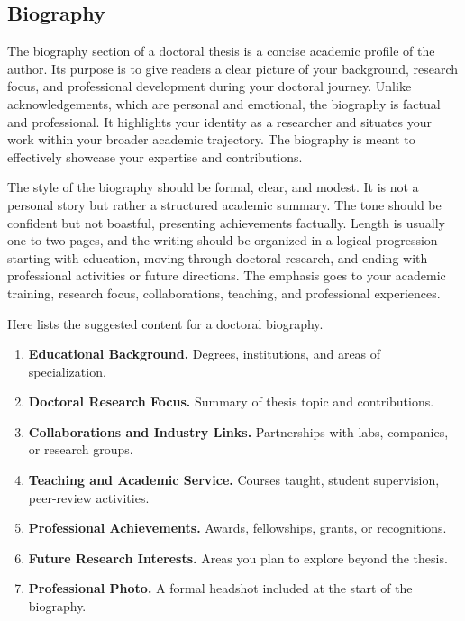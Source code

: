 \documentclass[PCOM,Thesis,Review]{mpThesis}
\newcommand{\Hd}[1]{{\color{SteelBlue}\bf#1.}}
\begin{document}
\begin{Appendix}
\chapter{Biography}
\label{app:biography}

\begin{Remark}
The biography section of a doctoral thesis is a concise academic profile of the author.
Its purpose is to give readers a clear picture of your background, research focus, and professional development during your doctoral journey.
Unlike acknowledgements, which are personal and emotional, the biography is factual and professional.
It highlights your identity as a researcher and situates your work within your broader academic trajectory.
The biography is meant to effectively showcase your expertise and contributions.

The style of the biography should be formal, clear, and modest.
It is not a personal story but rather a structured academic summary.
The tone should be confident but not boastful, presenting achievements factually.
Length is usually one to two pages, and the writing should be organized in a logical progression ---
starting with education, moving through doctoral research, and ending with professional activities or future directions.
The emphasis goes to your academic training, research focus, collaborations, teaching, and professional experiences.

Here lists the suggested content for a doctoral biography.
\begin{enumerate}
\item \Hd{Educational Background}
Degrees, institutions, and areas of specialization.

\item \Hd{Doctoral Research Focus}
Summary of thesis topic and contributions.

\item \Hd{Collaborations and Industry Links}
Partnerships with labs, companies, or research groups.

\item \Hd{Teaching and Academic Service}
Courses taught, student supervision, peer-review activities.

\item \Hd{Professional Achievements}
Awards, fellowships, grants, or recognitions.

\item \Hd{Future Research Interests}
Areas you plan to explore beyond the thesis.

\item \Hd{Professional Photo}
A formal headshot included at the start of the biography.
\end{enumerate}


\end{Remark}
\end{Appendix}
\end{document}
